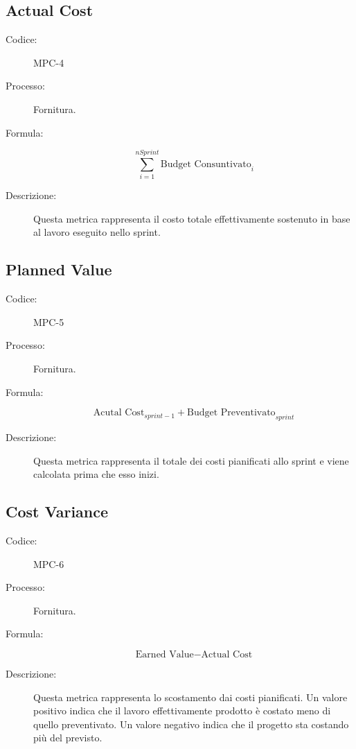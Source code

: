 \subsection{Actual Cost}
\begin{description}
    \item[Codice:] MPC-4
    \item[Processo:] Fornitura.
    \item[Formula:]
    \begin{equation}
        \sum_{i=1}^{nSprint} \text{Budget Consuntivato}_{i}
    \end{equation}
    \item[Descrizione:] Questa metrica rappresenta il costo totale effettivamente sostenuto in base al lavoro eseguito nello sprint.
\end{description}

\subsection{Planned Value}
\begin{description}
    \item[Codice:] MPC-5
    \item[Processo:] Fornitura.
    \item[Formula:]
    \begin{equation}
        \text{Acutal Cost}_{sprint - 1} + \text{Budget Preventivato}_{sprint} 
    \end{equation}
    \item[Descrizione:] Questa metrica rappresenta il totale dei costi pianificati allo sprint e viene calcolata prima che esso inizi.
\end{description}

\subsection{Cost Variance}
\begin{description}
    \item[Codice:] MPC-6
    \item[Processo:] Fornitura.
    \item[Formula:] 
    \begin{equation}
        \text{Earned Value} - \text{Actual Cost}
    \end{equation}
    \item[Descrizione:] Questa metrica rappresenta lo scostamento dai costi pianificati. Un valore positivo indica che il lavoro effettivamente prodotto è costato meno di quello preventivato. Un valore negativo indica che il progetto sta costando più del previsto.
\end{description}

